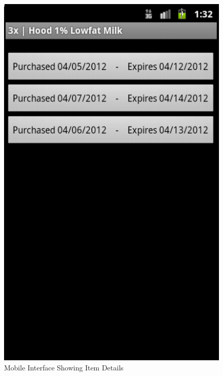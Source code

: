 \documentclass[11pt]{article} %
\begin{document}
\begin{figure}[h!]
\vspace{0.5cm}
\begin{center}
\includegraphics[scale=0.35]{../graphics/mobile_itemDetail}
\caption{Mobile Interface Showing Item Details}
\label{mob3}
\end{center}
\end{figure}
\end{document}
